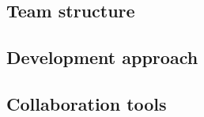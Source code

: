 
\subsection{Team structure}


\subsection{Development approach}


\subsection{Collaboration tools}
